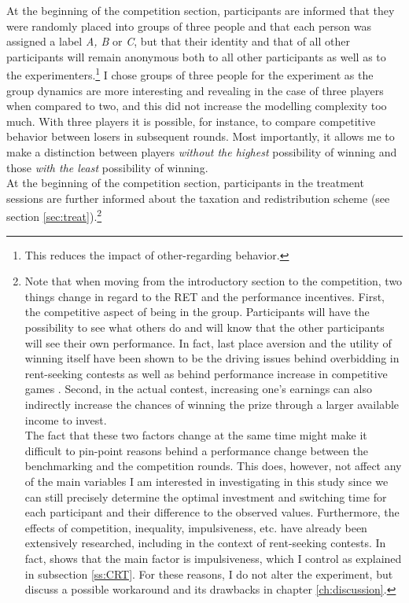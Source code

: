     At the beginning of the competition section, participants are informed that they were randomly placed into groups of three people and that each person was assigned a label \textit{A, B} or \textit{C}, but that their identity and that of all other participants will remain anonymous both to all other participants as well as to the experimenters.\footnote{This reduces the impact of other-regarding behavior.} I chose groups of three people for the experiment as the group dynamics are more interesting and revealing in the case of three players when compared to two, and this did not increase the modelling complexity too much. With three players it is possible, for instance, to compare competitive behavior between losers in subsequent rounds. Most importantly, it allows me to make a distinction between players \textit{without the highest} possibility of winning and those \textit{with the least} possibility of winning.\\
    
    At the beginning of the competition section, participants in the treatment sessions are further informed about the taxation and redistribution scheme (see section \ref{sec:treat}).\footnote{Note that when moving from the introductory section to the competition, two things change in regard to the RET and the performance incentives. First, the competitive aspect of being in the group. Participants will have the possibility to see what others do and will know that the other participants will see their own performance. In fact, last place aversion and the utility of winning itself have been shown to be the driving issues behind overbidding in rent-seeking contests as well as behind performance increase in competitive games \citep{sheremeta2013}. Second, in the actual contest, increasing one's earnings can also indirectly increase the chances of winning the prize through a larger available income to invest.\\
    The fact that these two factors change at the same time might make it difficult to pin-point reasons behind a performance change between the benchmarking and the competition rounds. This does, however, not affect any of the main variables I am interested in investigating in this study since we can still precisely determine the optimal investment and switching time for each participant and their difference to the observed values. Furthermore, the effects of competition, inequality, impulsiveness, etc. have already been extensively researched, including in the context of rent-seeking contests. In fact, \cite{sheremeta2016} shows that the main factor is impulsiveness, which I control as explained in subsection \ref{ss:CRT}. For these reasons, I do not alter the experiment, but discuss a possible workaround and its drawbacks in chapter \ref{ch:discussion}.} 
    
